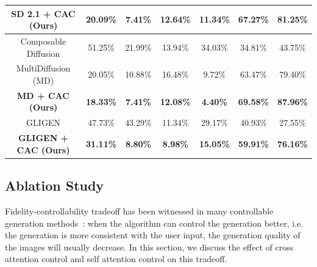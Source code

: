 \begin{table}[t]
\begin{tabular}{@{}ccccccc@{}}
\textbf{SD 2.1 + CAC (Ours)}     & \textbf{20.09\%}                                 & \textbf{7.41\%}                                 & \textbf{12.64\%}                                    & \textbf{11.34\%}                                    & \textbf{67.27\%}                                    & \textbf{81.25\%}                                   \\ \midrule
Composable Diffusion             & 51.25\%                                          & 21.99\%                                         & 13.94\%                                             & 34.03\%                                             & 34.81\%                                             & 43.75\%                                            \\
MultiDiffusion (MD)              & 20.05\%                                          & 10.88\%                                         & 16.48\%                                             & 9.72\%                                              & 63.47\%                                             & 79.40\%                                            \\
\textbf{MD + CAC (Ours)}         & \textbf{18.33\%}                                 & \textbf{7.41\%}                                 & \textbf{12.08\%}                                    & \textbf{4.40\%}                                     & \textbf{69.58\%}                                    & \textbf{87.96\%}                                   \\ \midrule
GLIGEN                           & 47.73\%                                          & 43.29\%                                         & 11.34\%                                             & 29.17\%                                             & 40.93\%                                             & 27.55\%                                            \\
\textbf{GLIGEN + CAC (Ours)}     & \textbf{31.11\%}                                 & \textbf{8.80\%}                                 & \textbf{8.98\%}                                     & \textbf{15.05\%}                                    & \textbf{59.91\%}                                    & \textbf{76.16\%}                                   \\ \bottomrule
\end{tabular}
\end{table}
\subsection{Ablation Study}
Fidelity-controllability tradeoff has been witnessed in many controllable generation methods~\citep{sdedit,e4e}: when the algorithm can control the generation better, i.e. the generation is more consistent with the user input, the generation quality of the images will usually decrease. In this section, we discuss the effect of cross attention control and self attention control on this tradeoff.

